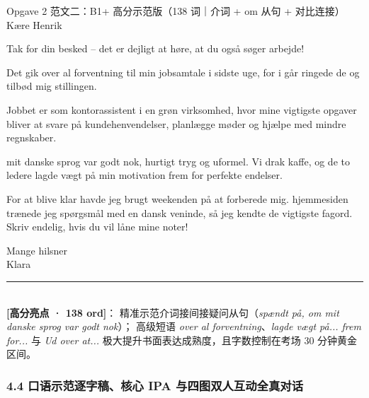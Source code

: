 \begin{emailbox}{Opgave 2 范文二：B1+ 高分示范版（138 词｜介词 + om 从句 + 对比连接）}
Kære Henrik

Tak for din besked -- det er dejligt at høre, at du også søger arbejde!

Det gik over al forventning til min jobsamtale i sidste uge, for i går ringede de og tilbød mig stillingen.

Jobbet er som kontorassistent i en grøn virksomhed, hvor mine vigtigste opgaver bliver at svare på kundehenvendelser, planlægge møder og hjælpe med mindre regnskaber.

 mit danske sprog var godt nok,  hurtigt tryg og uformel. Vi drak kaffe, og de to ledere lagde vægt på min motivation frem for perfekte endelser.

For at blive klar havde jeg brugt weekenden på at forberede mig.  hjemmesiden trænede jeg spørgsmål med en dansk veninde, så jeg kendte de vigtigste fagord. Skriv endelig, hvis du vil låne mine noter!

Mange hilsner\\
Klara

\vspace{0.3em}
\rule{\linewidth}{0.4pt}\\[0.2em]
\small\textbf{\color{NCDNavy}[高分亮点 · 138 ord]}： 精准示范介词接间接疑问从句（\textit{spændt på, om mit danske sprog var godt nok}）； 高级短语 \textit{over al forventning}、\textit{lagde vægt på... frem for...} 与 \textit{Ud over at...} 极大提升书面表达成熟度，且字数控制在考场 30 分钟黄金区间。
\end{emailbox}

\subsubsection*{4.4 口语示范逐字稿、核心 IPA 与四图双人互动全真对话}

